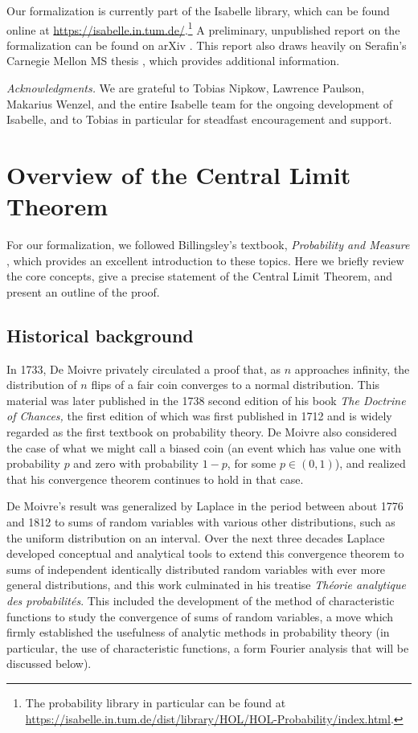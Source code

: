 \documentclass{svjour3}
\begin{document}
Our formalization is currently part of the Isabelle library, which can be found online at \url{https://isabelle.in.tum.de/}.\footnote{The probability library in particular can be found at \url{https://isabelle.in.tum.de/dist/library/HOL/HOL-Probability/index.html}.} A preliminary, unpublished report on the formalization can be found on arXiv \cite{avigad:hoelzl:serafin:14}. This report also draws heavily on Serafin's Carnegie Mellon MS thesis \cite{serafin:15}, which provides additional information.

\emph{Acknowledgments.} We are grateful to Tobias Nipkow, Lawrence Paulson, Makarius Wenzel, and the entire Isabelle team for the ongoing development of Isabelle, and to Tobias in particular for steadfast encouragement and support.

\section{Overview of the Central Limit Theorem}
\label{section:overview}

For our formalization, we followed Billingsley's textbook, \emph{Probability and Measure} \cite{billingsley:95}, which provides an excellent introduction to these topics. Here we briefly review the core concepts, give a precise statement of the Central Limit Theorem, and present an outline of the proof.

\subsection{Historical background}
\label{subsection:historical}

In 1733, De Moivre privately circulated a proof that, as $n$ approaches infinity, the distribution of $n$ flips of a fair coin converges to a normal distribution. This material was later published in the 1738 second edition of his book {\em The Doctrine of Chances,} the first edition of which was first published in 1712 and is widely regarded as the first textbook on probability theory. De Moivre also considered the case of what we might call a biased coin (an event which has value one with probability $p$ and zero with probability $1-p$, for some $p \in (0,1)$), and realized that his convergence theorem continues to hold in that case.

De Moivre's result was generalized by Laplace in the period between about 1776 and 1812 to sums of random variables with various other distributions, such as the uniform distribution on an interval. Over the next three decades Laplace developed conceptual and analytical tools to extend this convergence theorem to sums of independent identically distributed random variables with ever more general distributions, and this work culminated in his treatise {\em Th\'eorie analytique des probabilit\'es}. This included the development of the method of characteristic functions to study the convergence of sums of random variables, a move which firmly established the usefulness of analytic methods in probability theory (in particular, the use of characteristic functions, a form Fourier analysis that will be discussed below). 
\end{document}
